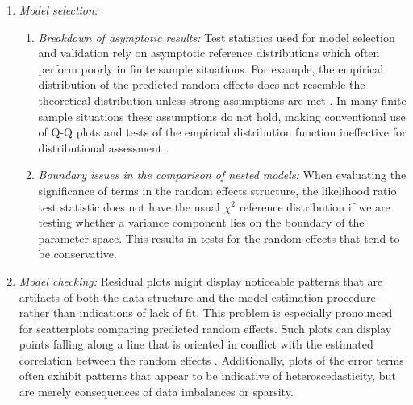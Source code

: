 \documentclass[12pt]{article}
\newcommand{\alnote}[1]{\todo[inline,color=green!40]{#1}} %
\newcommand{\hhnote}[1]{\todo[inline,color=orange!40]{#1}}
\begin{document}
\begin{enumerate}
\item {\em Model selection:}
\begin{enumerate}
\item {\em Breakdown of  asymptotic results:} Test statistics used for model selection and validation rely on asymptotic reference distributions which often perform poorly in finite sample situations. 
For example, the empirical distribution of the predicted random effects  does not resemble the theoretical distribution unless strong assumptions are met \citep[Theorem 3.2 and Lemma 3.1]{Jiang:1998vt}. In many finite sample situations these assumptions do not hold, making conventional use of Q-Q plots and tests of the empirical distribution function ineffective for distributional assessment \cite[see the supplement of][for supporting simulation results]{adam}.

\item {\em Boundary issues  in the comparison of nested models: } 
When evaluating the significance of terms in the random effects structure, the likelihood ratio test statistic does not have the usual $\chi^2$ reference distribution if we are testing whether a variance component lies on the boundary of the parameter space. This results in tests for the random effects that tend to be conservative.

\end{enumerate}


\item {\em Model checking:} Residual plots might display noticeable patterns that are artifacts of both the data structure and the model estimation procedure rather than indications of lack of fit. 
This problem is especially pronounced for  scatterplots comparing predicted random effects. Such plots can display points falling along a line that is oriented in conflict with the estimated correlation between the random effects \cite[see][for an example]{Morrell:2000ve}. 
Additionally,  plots of the error terms often exhibit patterns that appear to be indicative of heteroscedasticity, but are merely consequences of data imbalances or sparsity.

\end{enumerate}
\end{document}
